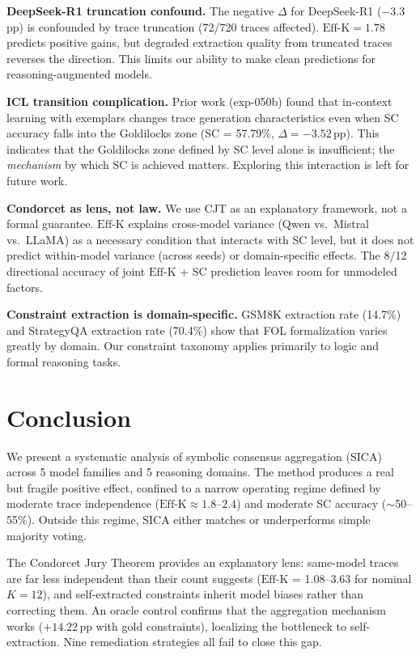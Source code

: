 \documentclass[11pt,a4paper]{article}
\newcommand{\effk}{\text{Eff-K}}
\begin{document}
\textbf{DeepSeek-R1 truncation confound.} The negative $\Delta$ for DeepSeek-R1 ($-3.3$\,pp) is confounded by trace truncation (72/720 traces affected). $\effk = 1.78$ predicts positive gains, but degraded extraction quality from truncated traces reverses the direction. This limits our ability to make clean predictions for reasoning-augmented models.

\textbf{ICL transition complication.} Prior work (exp-050b) found that in-context learning with exemplars changes trace generation characteristics even when SC accuracy falls into the Goldilocks zone (SC = 57.79\%, $\Delta = -3.52$\,pp). This indicates that the Goldilocks zone defined by SC level alone is insufficient; the \emph{mechanism} by which SC is achieved matters. Exploring this interaction is left for future work.

\textbf{Condorcet as lens, not law.} We use CJT as an explanatory framework, not a formal guarantee. $\effk$ explains cross-model variance (Qwen vs.\ Mistral vs.\ LLaMA) as a necessary condition that interacts with SC level, but it does not predict within-model variance (across seeds) or domain-specific effects. The 8/12 directional accuracy of joint $\effk$ + SC prediction leaves room for unmodeled factors.

\textbf{Constraint extraction is domain-specific.} GSM8K extraction rate (14.7\%) and StrategyQA extraction rate (70.4\%) show that FOL formalization varies greatly by domain. Our constraint taxonomy applies primarily to logic and formal reasoning tasks.


\section{Conclusion}
\label{sec:conclusion}

We present a systematic analysis of symbolic consensus aggregation (SICA) across 5 model families and 5 reasoning domains. The method produces a real but fragile positive effect, confined to a narrow operating regime defined by moderate trace independence ($\effk \approx 1.8$--$2.4$) and moderate SC accuracy ($\sim$50--55\%). Outside this regime, SICA either matches or underperforms simple majority voting.

The Condorcet Jury Theorem provides an explanatory lens: same-model traces are far less independent than their count suggests ($\effk$ = 1.08--3.63 for nominal $K=12$), and self-extracted constraints inherit model biases rather than correcting them. An oracle control confirms that the aggregation mechanism works ($+14.22$\,pp with gold constraints), localizing the bottleneck to self-extraction. Nine remediation strategies all fail to close this gap.
\end{document}
